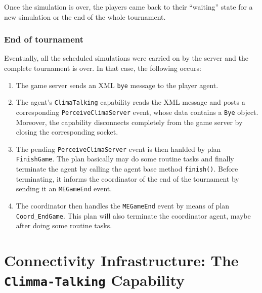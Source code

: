 \documentclass[10pt]{article}
\begin{document}
Once the simulation is over, the players came back to their ``waiting'' state
for a new simulation or the end of the whole tournament.


\subsubsection*{End of tournament}

Eventually, all the scheduled simulations were carried on by the server and the
complete tournament is over. In that case, the following occurs:

\begin{enumerate}
 \item The game server sends an XML \texttt{bye} message to the
player agent.

\item The agent's \texttt{ClimaTalking} capability reads the XML message 
and posts a corresponding \texttt{PerceiveClimaServer} event, whose data
contains a \texttt{Bye} object. Moreover, the capability disconnects completely
from the game server by closing the corresponding socket.


\item The pending \texttt{PerceiveClimaServer} event is then hanlded by plan
\texttt{FinishGame}. The plan basically may do some routine tasks and finally
terminate the agent by calling the agent base method \texttt{finish()}. Before
terminating, it informs the coordinator of the end of the tournament by sending
it an \texttt{MEGameEnd} event.

\item The coordinator then handles the \texttt{MEGameEnd} event by means of
plan \texttt{Coord\_EndGame}. This plan will also terminate the coordinator
agent, maybe after doing some routine tasks.
\end{enumerate}



\section{Connectivity Infrastructure: The \texttt{Climma-Talking} Capability}
\label{sec:clima-talking}
\end{document}
